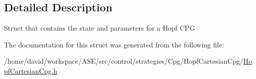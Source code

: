 \subsection{Detailed Description}
Struct that contains the state and parameters for a Hopf CPG 

The documentation for this struct was generated from the following file:\begin{CompactItemize}
\item 
/home/david/workspace/ASE/src/control/strategies/Cpg/HopfCartesianCpg/\hyperlink{HopfCartesianCpg_8h}{HopfCartesianCpg.h}\end{CompactItemize}
